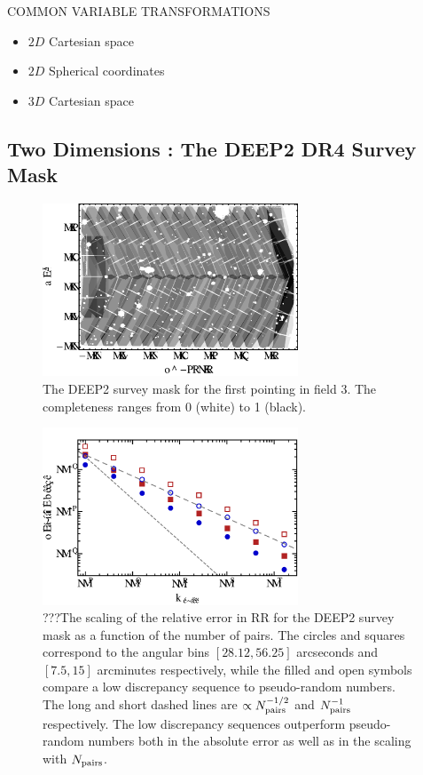 \documentclass[usenatbib]{mn2e}
\begin{document}
COMMON VARIABLE TRANSFORMATIONS
\begin{itemize}
  \item $2D$ Cartesian space
  \item $2D$ Spherical coordinates
  \item $3D$ Cartesian space
\end{itemize}

\lipsum[1-3]

\subsection{Two Dimensions : The DEEP2 DR4 Survey Mask}

\begin{figure}
\includegraphics[width=3in]{plots/deep2mask}
\caption{The DEEP2 survey mask for the first pointing in field 3. The
completeness ranges from 0 (white) to 1 (black). }
\label{fig:deep2mask}
\end{figure}

\begin{figure}
\includegraphics[width=3in]{plots/deep2rrcomp1}
\caption{???The scaling of the relative error in RR for the DEEP2 survey mask as
a function of the number of pairs. The circles and squares correspond to the
angular bins $[28.12,56.25]$ arcseconds and $[7.5,15]$ arcminutes respectively,
while the filled and open symbols compare a low discrepancy
sequence to pseudo-random numbers. The long and short dashed lines are
$\propto N_{\rm pairs}^{-1/2}$ and $N_{\rm pairs}^{-1}$ respectively. The low
discrepancy sequences outperform pseudo-random numbers both in the
absolute error as well as in the scaling with $N_{\rm pairs}$.}
\label{fig:deep2comp1}
\end{figure}
\end{document}

